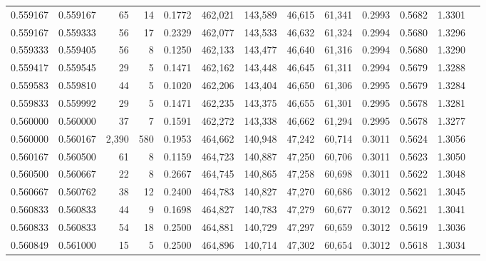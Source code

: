 \begin{tabular}{rrrrrrrrrrrrr}
0.559167 & 0.559167 &    65 &  14 &                                     0.1772 & 462,021 & 143,589 &  46,615 &  61,341 & 0.2993 & 0.5682 & 1.3301 \\
0.559167 & 0.559333 &    56 &  17 &                                     0.2329 & 462,077 & 143,533 &  46,632 &  61,324 & 0.2994 & 0.5680 & 1.3296 \\
0.559333 & 0.559405 &    56 &   8 &                                     0.1250 & 462,133 & 143,477 &  46,640 &  61,316 & 0.2994 & 0.5680 & 1.3290 \\
0.559417 & 0.559545 &    29 &   5 &                                     0.1471 & 462,162 & 143,448 &  46,645 &  61,311 & 0.2994 & 0.5679 & 1.3288 \\
0.559583 & 0.559810 &    44 &   5 &                                     0.1020 & 462,206 & 143,404 &  46,650 &  61,306 & 0.2995 & 0.5679 & 1.3284 \\
0.559833 & 0.559992 &    29 &   5 &                                     0.1471 & 462,235 & 143,375 &  46,655 &  61,301 & 0.2995 & 0.5678 & 1.3281 \\
0.560000 & 0.560000 &    37 &   7 &                                     0.1591 & 462,272 & 143,338 &  46,662 &  61,294 & 0.2995 & 0.5678 & 1.3277 \\
0.560000 & 0.560167 & 2,390 & 580 &                                     0.1953 & 464,662 & 140,948 &  47,242 &  60,714 & 0.3011 & 0.5624 & 1.3056 \\
0.560167 & 0.560500 &    61 &   8 &                                     0.1159 & 464,723 & 140,887 &  47,250 &  60,706 & 0.3011 & 0.5623 & 1.3050 \\
0.560500 & 0.560667 &    22 &   8 &                                     0.2667 & 464,745 & 140,865 &  47,258 &  60,698 & 0.3011 & 0.5622 & 1.3048 \\
0.560667 & 0.560762 &    38 &  12 &                                     0.2400 & 464,783 & 140,827 &  47,270 &  60,686 & 0.3012 & 0.5621 & 1.3045 \\
0.560833 & 0.560833 &    44 &   9 &                                     0.1698 & 464,827 & 140,783 &  47,279 &  60,677 & 0.3012 & 0.5621 & 1.3041 \\
0.560833 & 0.560833 &    54 &  18 &                                     0.2500 & 464,881 & 140,729 &  47,297 &  60,659 & 0.3012 & 0.5619 & 1.3036 \\
0.560849 & 0.561000 &    15 &   5 &                                     0.2500 & 464,896 & 140,714 &  47,302 &  60,654 & 0.3012 & 0.5618 & 1.3034 \\

\end{tabular}
